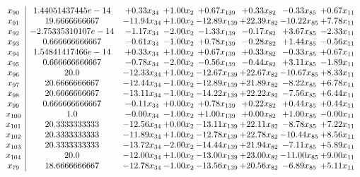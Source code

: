 \documentclass[8pt]{article}
\begin{document}
\[\begin{array}{c| c c@{\hskip 2pt} c@{\hskip 2pt} c@{\hskip 2pt} c@{\hskip 2pt} c@{\hskip 2pt} c@{\hskip 2pt} }
 x_{90}   &  1.44051437445e-14 & +  0.33 x_{34} & +  1.00 x_{2} & +  0.67 x_{139} & +  0.33 x_{82} & -0.33 x_{85} & +  0.67 x_{11}\\
 x_{91}   &  19.6666666667 & -11.94 x_{34} & +  1.00 x_{2} & -12.89 x_{139} & + 22.39 x_{82} & -10.22 x_{85} & +  7.78 x_{11}\\
 x_{92}   &  -2.75335310107e-14 & -1.17 x_{34} & -2.00 x_{2} & -1.33 x_{139} & -0.17 x_{82} & +  3.67 x_{85} & -2.33 x_{11}\\
 x_{93}   &  0.666666666667 & -0.61 x_{34} & -1.00 x_{2} & +  0.78 x_{139} & -0.28 x_{82} & +  1.44 x_{85} & -0.56 x_{11}\\
 x_{94}   &  1.54841417466e-14 & +  0.33 x_{34} & +  1.00 x_{2} & +  0.67 x_{139} & +  0.33 x_{82} & -0.33 x_{85} & +  0.67 x_{11}\\
 x_{95}   &  0.666666666667 & -0.78 x_{34} & -2.00 x_{2} & -0.56 x_{139} & -0.44 x_{82} & +  3.11 x_{85} & -1.89 x_{11}\\
 x_{96}   &  20.0 & -12.33 x_{34} & +  1.00 x_{2} & -12.67 x_{139} & + 22.67 x_{82} & -10.67 x_{85} & +  8.33 x_{11}\\
 x_{97}   &  20.6666666667 & -12.44 x_{34} & -1.00 x_{2} & -12.89 x_{139} & + 21.89 x_{82} & -8.22 x_{85} & +  6.78 x_{11}\\
 x_{98}   &  20.6666666667 & -13.11 x_{34} & -1.00 x_{2} & -14.22 x_{139} & + 22.22 x_{82} & -7.56 x_{85} & +  6.44 x_{11}\\
 x_{99}   &  0.666666666667 & -0.11 x_{34} & +  0.00 x_{2} & +  0.78 x_{139} & +  0.22 x_{82} & +  0.44 x_{85} & +  0.44 x_{11}\\
 x_{100}   &  1.0 & -0.00 x_{34} & -1.00 x_{2} & +  1.00 x_{139} & +  0.00 x_{82} & +  1.00 x_{85} & -0.00 x_{11}\\
 x_{101}   &  20.3333333333 & -12.56 x_{34} & +  0.00 x_{2} & -13.11 x_{139} & + 22.11 x_{82} & -8.78 x_{85} & +  7.22 x_{11}\\
 x_{102}   &  20.3333333333 & -11.89 x_{34} & +  1.00 x_{2} & -12.78 x_{139} & + 22.78 x_{82} & -10.44 x_{85} & +  8.56 x_{11}\\
 x_{103}   &  20.3333333333 & -13.72 x_{34} & -2.00 x_{2} & -14.44 x_{139} & + 21.94 x_{82} & -7.11 x_{85} & +  5.89 x_{11}\\
 x_{104}   &  20.0 & -12.00 x_{34} & +  1.00 x_{2} & -13.00 x_{139} & + 23.00 x_{82} & -11.00 x_{85} & +  9.00 x_{11}\\
 x_{79}   &  18.6666666667 & -12.78 x_{34} & -1.00 x_{2} & -13.56 x_{139} & + 20.56 x_{82} & -6.89 x_{85} & +  5.11 x_{11}\\

\end{array}\]
\end{document}
